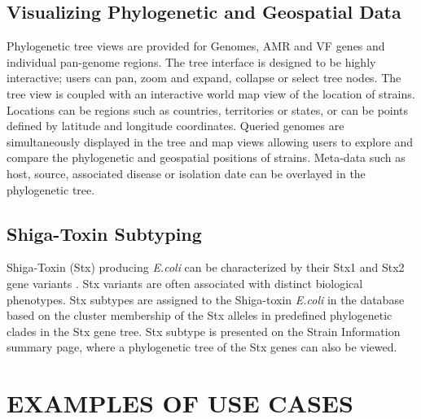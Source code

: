 \documentclass[a4paper,twoside]{article}
\begin{document}
\subsection{Visualizing Phylogenetic and Geospatial Data}

Phylogenetic tree views are provided for Genomes, AMR and VF genes and individual pan-genome regions. The tree interface is designed to be highly interactive; users can pan, zoom and expand, collapse or select tree nodes. The tree view is coupled with an interactive world map view of the location of strains. Locations can be regions such as countries, territories or states, or can be points defined by latitude and longitude coordinates. Queried genomes are simultaneously displayed in the tree and map views allowing users to explore and compare the phylogenetic and geospatial positions of strains. Meta-data such as host, source, associated disease or isolation date can be overlayed in the phylogenetic tree.

\subsection{Shiga-Toxin Subtyping}

Shiga-Toxin (Stx) producing \textit{E.coli} can be characterized by their Stx1 and Stx2 gene variants \cite{scheutz_multicenter_2012}. Stx variants are often associated with distinct biological phenotypes. Stx subtypes are assigned to the Shiga-toxin \textit{E.coli} in the database based on the cluster membership of the Stx alleles in predefined phylogenetic clades in the Stx gene tree. Stx subtype is presented on the Strain Information summary page, where a phylogenetic tree of the Stx genes can also be viewed.

\section{\uppercase{Examples of Use Cases}}
\label{sec:cases}
\end{document}
